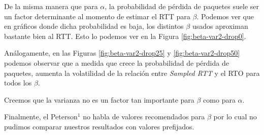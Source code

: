 De la misma manera que para $\alpha$, la probabilidad de pérdida de paquetes suele ser un factor determinante al momento de estimar el RTT para $\beta$. Podemos ver que en gráficos donde dicha probabilidad es baja, los distintos $\beta$ usados aproximan bastante bien al RTT. Esto lo podemos ver en la Figura \ref{fig:beta-var2-drop0}.

Análogamente, en las Figuras \ref{fig:beta-var2-drop25} y \ref{fig:beta-var2-drop50} podemos observar que a medida que crece la probabilidad de pérdida de paquetes, aumenta la volatilidad de la relación entre \emph{Sampled RTT} y el RTO para todos los $\beta$.

Creemos que la varianza no es un factor tan importante para $\beta$ como para $\alpha$.

Finalmente, el Peterson$^1$ no habla de valores recomendados para $\beta$ por lo cual no pudimos comparar nuestros resultados con valores prefijados.